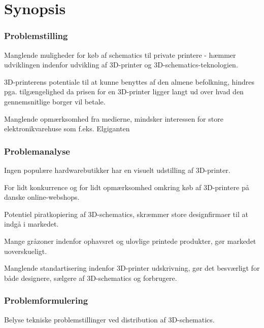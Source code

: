 \chapter{Synopsis} %
\label{cha:synopsis}


\subsection{Problemstilling} %
\label{sub:problemstilling}

Manglende muligheder for køb af schematics til private printere - hæmmer udviklingen indenfor udvikling af 3D-printer og 3D-schematics-teknologien.

3D-printerens potentiale til at kunne benyttes af den almene befolkning, hindres pga. tilgængelighed da prisen for en 3D-printer ligger langt ud over hvad den gennemsnitlige borger vil betale.

Manglende opmærksomhed fra medierne, mindsker interessen for store elektronikvarehuse som f.eks. Elgiganten



\subsection{Problemanalyse} %
\label{sub:problemanalyse}

Ingen populære hardwarebutikker har en visuelt udstilling af 3D-printer.

For lidt konkurrence og for lidt opmærksomhed omkring køb af 3D-printere på danske online-webshops.

Potentiel piratkopiering af 3D-schematics, skræmmer store designfirmaer til at indgå i markedet.

Mange gråzoner indenfor ophavsret og ulovlige printede produkter, gør markedet uoverskueligt.

Manglende standartisering indenfor 3D-printer udskrivning, gør det besværligt for både designere, sælgere af 3D-schematics og forbrugere.



\subsection{Problemformulering} %
\label{sub:problemformulering}

Belyse tekniske problemstillinger ved distribution af 3D-schematics.





